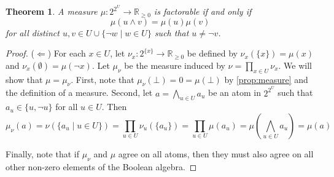 \documentclass{article}
\newtheorem{theorem}{Theorem}
\theoremstyle{definition}
\theoremstyle{remark}
\begin{document}
{

\begin{theorem}
  A measure $\mu\colon 2^{2^U} \to \mathbb{R}_{\ge 0}$ is factorable if and only
  if
  \begin{equation} \label{eq:wmccondition}
  \mu(u \land v) = \mu(u)\mu(v)
  \end{equation}
  for all distinct $u, v \in U \cup \{ \neg w \mid w \in U \}$ such that $u \ne
  \neg v$.
\end{theorem}
\begin{proof}
  ($\Leftarrow$) For each $x \in U$, let $\nu_x\colon 2^{\{x\}} \to
  \mathbb{R}_{\ge 0}$ be defined by $\nu_x(\{ x \}) = \mu(x)$ and
  $\nu_x(\emptyset) = \mu(\neg x)$. Let $\mu_\nu$ be the measure induced by $\nu
  = \prod_{x \in U} \nu_x$. We will show that $\mu = \mu_\nu$. First, note that
  $\mu_\nu(\bot) = 0 = \mu(\bot)$ by \cref{prop:measure} and the definition of a
  measure. Second, let $a = \bigwedge_{u \in U} a_u$ be an atom in $2^{2^U}$
  such that $a_u \in \{ u, \neg u \}$ for all $u \in U$. Then
  \[
    \mu_\nu(a) = \nu(\{ a_u \mid u \in U \}) = \prod_{u \in U} \nu_u(\{a_u\}) =
    \prod_{u \in U} \mu(a_u) = \mu\left(\bigwedge_{u \in U} a_u \right) = \mu(a)
  \]

  Finally, note that if $\mu_\nu$ and $\mu$ agree on all atoms, then they must
  also agree on all other non-zero elements of the Boolean algebra.


\end{proof}}
\end{document}

